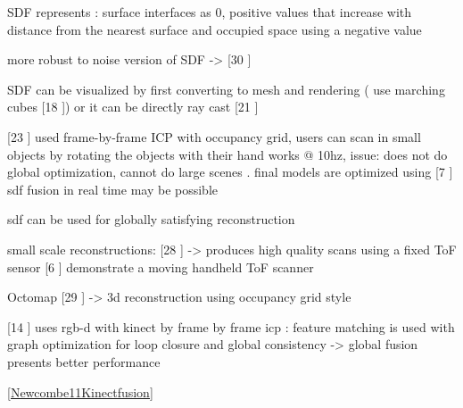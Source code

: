 SDF represents : surface interfaces as 0, positive values that increase with distance from the nearest surface
and occupied space using a negative value

more robust to noise version of SDF -> [30 \cite{Zach07Globally} ]

SDF can be visualized by first converting to mesh and rendering ( use marching cubes [18 \cite{Cubes87High}]) or it can be directly ray cast [21 \cite{Parker98Interactive}]

[23 \cite{Rusinkiewicz02Real}] used frame-by-frame ICP with occupancy grid, users can scan in small objects by rotating the objects with their hand
works @ 10hz, issue: does not do global optimization, cannot do large scenes . final models are optimized using [7 \cite{Curless96Volumetric}]
sdf fusion in real time may be possible

sdf can be used for globally satisfying reconstruction

small scale reconstructions:
	[28 \cite{Weise09Hand}] -> produces high quality scans using a fixed ToF sensor
	[6 \cite{Cui103d} ] demonstrate a moving handheld ToF scanner

Octomap [29 \cite{Wurm10Octomap}] -> 3d reconstruction using occupancy grid style 

[14 \cite{Henry10Rgb}] uses rgb-d with kinect by frame by frame icp : feature matching is used with graph optimization for loop closure and global consistency -> global fusion presents better performance








































\ref{Newcombe11Kinectfusion}

